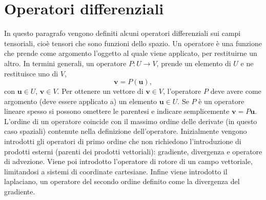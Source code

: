 \section{Operatori differenziali}\label{ch:operatoriDiff}
In questo paragrafo vengono definiti alcuni operatori differenziali sui campi tensoriali, cioè tensori che sono funzioni dello spazio. Un operatore è una funzione che prende come argomento l'oggetto al quale viene applicato, per restituirne un altro. In termini generali, un operatore $P: U \rightarrow V$, prende un elemento di $U$ e ne restituisce uno di $V$,
\begin{equation}\label{def:operatore}
  \bm{v} = P(\bm{u}),
\end{equation}
con $\bm{u} \in U$, $\bm{v} \in V$. Per ottenere un vettore di $\bm{v} \in V$, l'operatore $P$ deve avere come argomento (deve essere applicato a) un elemento $\bm{u} \in U$. Se $P$ è un operatore lineare spesso si possono omettere le parentesi e indicare semplicemente $\bm{v}=P\bm{u}$.
L'ordine di un operatore coincide con il massimo ordine delle derivate (in questo caso spaziali) contenute nella definizione dell'operatore. Inizialmente vengono introdotti gli operatori di primo ordine che non richiedono l'introduzione di prodotti esterni (parenti dei prodotti vettoriali): gradiente, divergenza e operatore di advezione. Viene poi introdotto l'operatore di rotore di un campo vettoriale, limitandosi a sistemi di coordinate cartesiane. Infine viene introdotto il laplaciano, un operatore del secondo ordine definito come la divergenza del gradiente.

